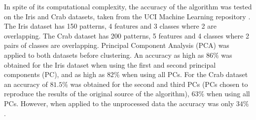 In spite of its computational complexity, the accuracy of the algorithm was tested on the Iris and Crab datasets, taken from the UCI Machine Learning repository \cite{Lichman:2013}.
The Iris dataset has 150 patterns, 4 features and 3 classes where 2 are overlapping.
The Crab dataset has 200 patterns, 5 features and 4 classes where 2 pairs of classes are overlapping.
Principal Component Analysis (PCA) was applied to both datasets before clustering.
An accuracy as high as $86\%$ was obtained for the Iris dataset when using the first and second principal components (PC), and as high as $82\%$ when using all PCs.
For the Crab dataset an accuracy of $81.5\%$ was obtained for the second and third PCs (PCs chosen to reproduce the results of the original source of the algorithm), $63\%$ when using all PCs.
However, when applied to the unprocessed data the accuracy was only $34\%$ .












